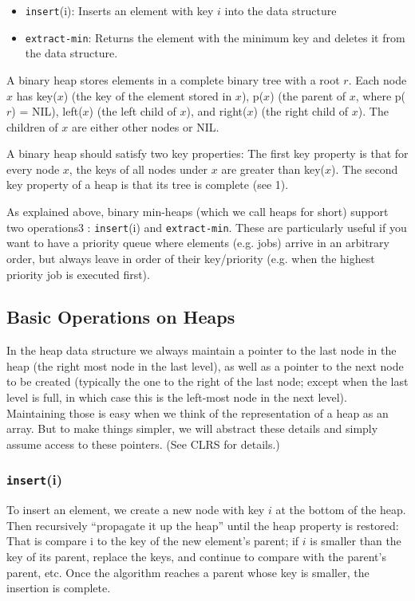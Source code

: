 \documentclass [12pt]{article}
\begin{document}
\begin{itemize}
  \item \texttt{insert}(i): Inserts an element with key $i$ into the data structure
  \item \texttt{extract-min}: Returns the element with the minimum key and deletes it from the data structure. 
\end{itemize}

A binary heap stores elements in a complete binary tree with a root $r$. Each node $x$ has key($x$) (the key of the element stored in $x$), p($x$) (the parent of $x$, where p($r$) = NIL), left($x$) (the left child of $x$), and right($x$) (the right child of $x$). The children of $x$ are either other nodes or NIL.

A binary heap should satisfy two key properties: The first key property is that for every node $x$, the keys of all nodes under $x$ are greater than key($x$). The second key property of a heap is that its tree is complete (see 1). 

As explained above, binary min-heaps (which we call heaps for short) support two operations3 : \texttt{insert}(i) and \texttt{extract-min}. These are particularly useful if you want to have a priority queue where elements (e.g. jobs) arrive in an arbitrary order, but always leave in order of their key/priority (e.g. when the highest priority job is executed first).

\subsection{Basic Operations on Heaps}
In the heap data structure we always maintain a pointer to the last node in the heap (the right most node in the last level), as well as a pointer to the next node to be created (typically the one to the right of the last node; except when the last level is full, in which case this is the left-most node in the next level). Maintaining those is easy when we think of the
representation of a heap as an array. But to make things simpler, we will abstract these details and simply assume access to these pointers. (See CLRS for details.)

\subsubsection{\texttt{insert}(i)} 
To insert an element, we create a new node with key $i$ at the bottom of the heap. Then recursively “propagate it up the heap” until the heap property is restored: That is compare i to the key of the new element's parent; if $i$ is smaller than the key of its parent, replace the keys, and continue to compare with the parent's parent, etc. Once the algorithm reaches a parent whose key is smaller, the insertion is complete.
\end{document}
